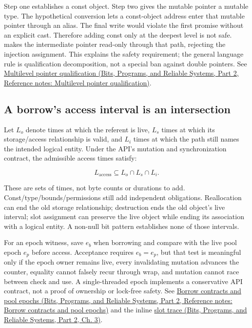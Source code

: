 Step one establishes a const object. Step two gives the mutable pointer a mutable type. The hypothetical conversion lets a const-object address enter that mutable pointer through an alias. The final write would violate the first promise without an explicit cast. Therefore adding const only at the deepest level is not safe.  makes the intermediate pointer read-only through that path, rejecting the injection assignment. This explains the safety requirement; the general language rule is qualification decomposition, not a special ban against double pointers. See \href{../01-Bits-Programs-and-Reliable-Systems-P02/main.pdf\#appendix-5e1a7561cd98}{Multilevel pointer qualification (Bits, Programs, and Reliable Systems, Part 2, Reference notes: Multilevel pointer qualification)}.

\subsection{A borrow's access interval is an intersection}\label{03-visual-computing-i-ch018-a-borrows-access-interval-is-an-intersection}

\hypertarget{03-visual-computing-i-ch018-a-borrows-access-interval-is-an-intersection}{}

Let \(L_o\) denote times at which the referent is live, \(L_s\) times at which its storage/access relationship is valid, and \(L_i\) times at which the path still names the intended logical entity. Under the API's mutation and synchronization contract, the admissible access times satisfy:

\[
L_{\mathrm{access}}\subseteq L_o\cap L_s\cap L_i.
\]

These are sets of times, not byte counts or durations to add. Const/type/bounds/permissions still add independent obligations. Reallocation can end the old storage relationship; destruction ends the old object's live interval; slot assignment can preserve the live object while ending its association with a logical entity. A non-null bit pattern establishes none of those intervals.

For an epoch witness, save \(e_b\) when borrowing and compare with the live pool epoch \(e_p\) before access. Acceptance requires \(e_b=e_p\), but that test is meaningful only if the epoch owner remains live, every invalidating mutation advances the counter, equality cannot falsely recur through wrap, and mutation cannot race between check and use. A single-threaded epoch implements a conservative API contract, not a proof of ownership or lock-free safety. See \href{../01-Bits-Programs-and-Reliable-Systems-P02/main.pdf\#appendix-aa405b7c3903}{Borrow contracts and pool epochs (Bits, Programs, and Reliable Systems, Part 2, Reference notes: Borrow contracts and pool epochs)} and the inline \href{../01-Bits-Programs-and-Reliable-Systems-P02/main.pdf\#01-foundations-i-ch003-when-a-valid-borrow-stops-naming-the-intended-thing}{slot trace (Bits, Programs, and Reliable Systems, Part 2, Ch. 3)}.

